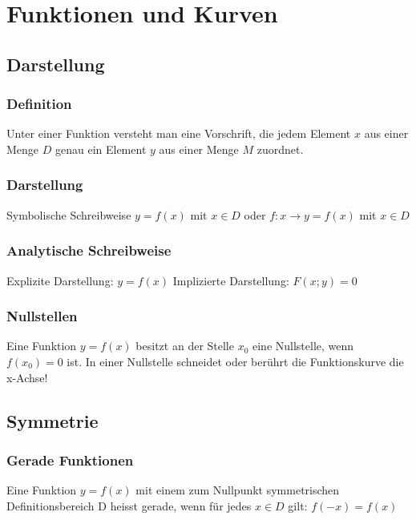\chapter{Funktionen und Kurven}
\section{Darstellung} %
\label{sec:darstellung}

\subsection{Definition}
Unter einer Funktion versteht man eine Vorschrift, die jedem Element \(x\) aus einer Menge \(D\) genau ein Element \(y\) aus einer Menge \(M\) zuordnet.

\subsection{Darstellung}
Symbolische Schreibweise
\newline \(y = f(x)\) mit \(x \in D\) oder
\newline \(f: x \rightarrow y = f(x)\) mit \(x \in D\)

\subsection{Analytische Schreibweise}
Explizite Darstellung: \(y = f (x) \)
\newline Implizierte Darstellung: \(F(x;y) = 0\)

\subsection{Nullstellen} %
\label{sec:nullstellen}
Eine Funktion \(y = f(x)\) besitzt an der Stelle \(x_{0}\) eine Nullstelle, wenn \(f(x_{0}) = 0\) ist.
\newline In einer Nullstelle schneidet oder berührt die Funktionskurve die x-Achse!

\section{Symmetrie} %
\subsection{Gerade Funktionen} %
Eine Funktion \(y = f(x)\) mit einem zum Nullpunkt symmetrischen Definitionsbereich D heisst gerade, wenn für jedes \(x \in D\) gilt:
\newline \(f(-x) = f(x)\)

